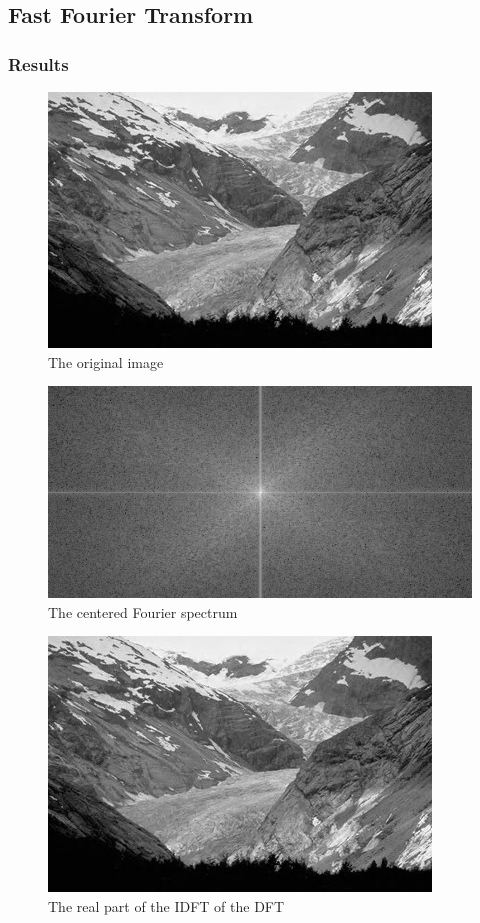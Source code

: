 \documentclass{article}
\begin{document}

\subsection{Fast Fourier Transform}

\subsubsection{Results}
\begin{figure}[H]
	\centering
	\includegraphics[width=288pt]{../img/02.png}
	\caption{The original image}
\end{figure}

\begin{figure}[H]
	\centering
	\includegraphics[width=384pt]{../result/fft-spectrum.png}
	\caption{The centered Fourier spectrum}
\end{figure}

\begin{figure}[H]
	\centering
	\includegraphics[width=288pt]{../result/fft-double.png}
	\caption{The real part of the IDFT of the DFT}
\end{figure}
\end{document}
